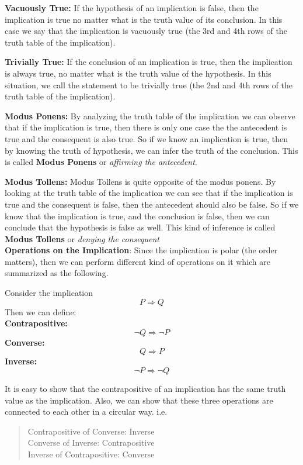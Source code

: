 \textbf{Vacuously True:} If the hypothesis of an implication is false, then the implication is true no matter what is the truth value of its conclusion. In this case we say that the implication is vacuously true (the 3rd and 4th rows of the truth table of the implication). 

\textbf{Trivially True:} If the conclusion of an implication is true, then the implication is always true, no matter what is the truth value of the hypothesis. In this situation, we call the statement to be trivially true (the 2nd and 4th rows of the truth table of the implication).


\textbf{Modus Ponens:} By analyzing the truth table of the implication we can observe that if the implication is true, then there is only one case the the antecedent is true and the consequent is also true. So if we know an implication is true, then by knowing the truth of hypothesis, we can infer the truth of the conclusion. This is called \textbf{Modus Ponens} or \emph{affirming the antecedent}.

\textbf{Modus Tollens:} Modus Tollens is quite opposite of the modus ponens. By looking at the truth table of the implication we can see that if the implication is true and the consequent is false, then the antecedent should also be false. So if we know that the implication is true, and the conclusion is false, then we can conclude that the hypothesis is false as well. This kind of inference is called \textbf{Modus Tollens} or \emph{denying the consequent} \\

\textbf{Operations on the Implication}: Since the implication is polar (the order matters), then we can perform different kind of operations on it which are summarized as the following.

\begin{defbox}{}
	Consider the implication
	\[  P \Rightarrow Q  \]
	Then we can define:\\
	
	\textbf{Contrapositive:}
	\[  \neg Q \Rightarrow \neg P  \]
	\textbf{Converse:}
	\[  Q \Rightarrow P  \] 
	\textbf{Inverse:}
	\[ \neg P \Rightarrow \neg Q \]
\end{defbox}

It is easy to show that the contrapositive of an implication has the same truth value as the implication. Also, we can show that these three operations are connected to each other in a circular way. i.e.
\begin{quote}
	Contrapositive of Converse: Inverse \\
	Converse of Inverse: Contrapositive \\
	Inverse of Contrapositive: Converse
\end{quote}


